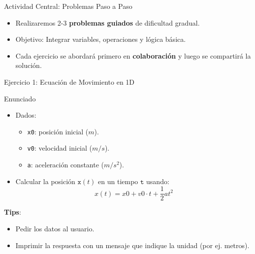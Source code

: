 \documentclass[10pt]{beamer}
\begin{document}
\begin{frame}{Actividad Central: Problemas Paso a Paso}
  \begin{itemize}
    \item Realizaremos 2-3 \textbf{problemas guiados} de dificultad gradual.
    \item Objetivo: Integrar variables, operaciones y lógica básica.
    \item Cada ejercicio se abordará primero en \textbf{colaboración} y luego se compartirá la solución.
  \end{itemize}
\end{frame}

\begin{frame}{Ejercicio 1: Ecuación de Movimiento en 1D}
  \begin{block}{Enunciado}
    \begin{itemize}
      \item Dados:
        \begin{itemize}
          \item \texttt{x0}: posición inicial (\(m\)).
          \item \texttt{v0}: velocidad inicial (\(m/s\)).
          \item \texttt{a}: aceleración constante (\(m/s^2\)).
        \end{itemize}
      \item Calcular la posición \(\texttt{x}(t)\) en un tiempo \(\texttt{t}\) usando:
        \[
          x(t) = x0 + v0\cdot t + \frac{1}{2} a t^2
        \]
    \end{itemize}
  \end{block}
  \textbf{Tips}:
  \begin{itemize}
    \item Pedir los datos al usuario.
    \item Imprimir la respuesta con un mensaje que indique la unidad (por ej. metros).
  \end{itemize}
\end{frame}
\end{document}
